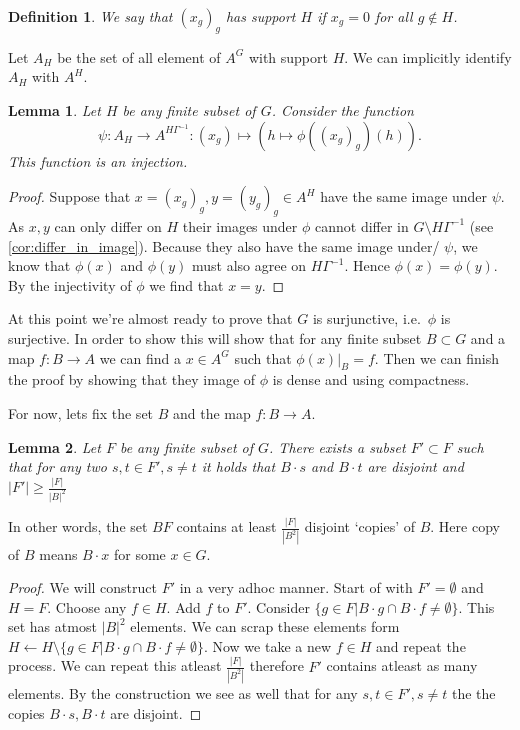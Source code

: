 \documentclass[titlepage, a4paper]{article}
\newcommand{\card}[1]{\left| #1 \right|}
\newtheorem{definition}{Definition}
\newtheorem{lemma}{Lemma}
\theoremstyle{remark}
\begin{document}
\begin{definition}
	We say that $(x_g)_g$ has support $H$ if $x_g = 0$ for all $g \not\in H$.
\end{definition}
Let $A_H$ be the set of all element of  $A^{G}$ with support $H$. We can implicitly identify $A_H$ with $A^{H}$.

\begin{lemma}\label{lem:injective_restriction}
	Let $H$ be any finite subset of $G$. Consider the function  \[
		\psi:A_H \to A ^{H\Gamma^{-1}}: (x_g) \mapsto \left(h \mapsto \phi((x_g)_g)(h)\right)
	.\]  
	This function is an injection. 
\end{lemma}
\begin{proof}
	Suppose that $x= (x_g)_g, y = (y_g)_g \in A^{H}$ have the same image under $\psi$. As $x, y$ can only differ on $ H$ their images under $\phi$ cannot differ in $G\setminus H\Gamma^{-1}$ (see \cref{cor:differ_in_image}). Because they also have the same image under/ $\psi$, we know that $\phi(x)$ and $\phi(y)$ must also agree on $H\Gamma^{-1}$. Hence $\phi(x) = \phi(y)$. By the injectivity of $\phi$ we find that $x = y$.
\end{proof}

At this point we're almost ready to prove that $G$ is surjunctive, i.e.\ $\phi$ is surjective. 
In order to show this will show that for any finite subset $B\subset G$ and a map $f:B \to A$ we can find a $x \in A^{G}$ such that $\phi\left(x \right) |_B  = f$. Then we can finish the proof by showing that they image of $\phi$ is dense and using compactness.

\bigskip

For now, lets fix the set $B$ and the map $f:B \to A$. 

\begin{lemma}\label{lem:copies_of_B}
	Let $F$ be any finite subset of $G$. There exists a subset $F' \subset F$ such that for any two  $s,t \in F', s\ne t$ it holds that $B\cdot s$ and  $B\cdot t$ are disjoint and $\card{F'} \ge \frac{\card{F}}{\card{B}^2} $
\end{lemma}
In other words, the set  $BF$ contains at least $\frac{\card{F}}{\card{B^2}}$ disjoint `copies' of $B$. Here copy of $B$ means $B\cdot x$ for some $x \in G$.
\begin{proof}
We will construct $F'$ in a very adhoc manner. 
Start of with $F' = \emptyset$ and $H = F$. Choose any  $f \in H$. Add $f$ to $F'$. Consider $\{g \in F | B\cdot g \cap B\cdot f \ne \emptyset\} $. This set has atmost $\card{B}^2$ elements. 
We can scrap these elements form $H \leftarrow H \setminus \{g \in F | B\cdot g \cap B\cdot f \ne \emptyset\}$. Now we take a new  $f \in H$ and repeat the process.
We can repeat this atleast $\frac{\card{F}}{\card{B^2}}$ therefore $F'$ contains atleast as many elements. 
By the construction we see as well that for any $s, t \in F', s\ne t$ the the copies  $B\cdot s, B\cdot t$  are disjoint.
\end{proof}
\end{document}

